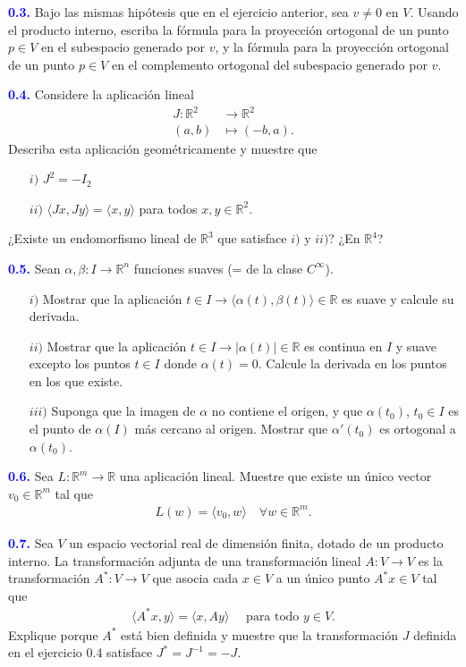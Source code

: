 \documentclass[oneside,11pt]{memoir}
\begin{document}
\textcolor{blue}{\textbf{0.3.}} Bajo las mismas hipótesis que en el ejercicio anterior, sea $v\neq 0$ en $V$. Usando el producto interno, escriba la fórmula para la proyección ortogonal de un punto $p\in V$ en el subespacio generado por $v$, y la fórmula para la proyección ortogonal de un punto $p\in V$ en el complemento ortogonal del subespacio generado por $v$.

\textcolor{blue}{\textbf{0.4.}} Considere la aplicación lineal 
\begin{align*}
    J:\mathbb{R}^2&\to \mathbb{R}^2\\
    (a,b)&\mapsto (-b,a).
\end{align*}
Describa esta aplicación geométricamente y muestre que
\begin{enumerate}
    \item[$i)$] $J^2=-I_2$
    \item[$ii)$] $\langle Jx, Jy \rangle = \langle x,y\rangle$ para todos $x,y\in \mathbb{R}^2$.
\end{enumerate}
¿Existe un endomorfismo lineal de $\mathbb{R}^3$ que satisface $i)$ y $ii)$? ¿En $\mathbb{R}^4$?

\textcolor{blue}{\textbf{0.5.}} Sean $\alpha,\beta:I\to \mathbb{R}^n$ funciones suaves (= de la clase $C^\infty$).
\begin{enumerate}
    \item[$i)$] Mostrar que la aplicación $t\in I\to \langle\alpha(t),\beta(t)\rangle \in \mathbb{R}$ es suave y calcule su derivada.
    \item[$ii)$] Mostrar que la aplicación $t\in I\to |\alpha(t)| \in \mathbb{R}$ es continua en $I$ y suave excepto los puntos $t\in I$ donde $\alpha(t)=0$. Calcule la derivada en los puntos en los que existe.
    \item[$iii)$] Suponga que la imagen de $\alpha$ no contiene el origen, y que $\alpha(t_0)$, $t_0\in I$ es el punto de $\alpha(I)$ más cercano al origen. Mostrar que $\alpha'(t_0)$ es ortogonal a $\alpha(t_0)$.
\end{enumerate}

\textcolor{blue}{\textbf{0.6.}}  Sea $L:\mathbb{R}^m\to \mathbb{R}$ una aplicación lineal. Muestre que existe un único vector $v_0\in\mathbb{R}^m$ tal que
\begin{align*}
    L(w)=\langle v_0,w\rangle \quad \forall w\in\mathbb{R}^m.
\end{align*}

\textcolor{blue}{\textbf{0.7.}} Sea $V$ un espacio vectorial real de dimensión finita, dotado de un producto interno. La transformación adjunta de una transformación lineal $A:V\to V$ es la transformación $A^*:V\to V$ que asocia cada $x\in V$ a un único punto $A^*x\in V$ tal que
\begin{align*}
    \langle A^*x,y\rangle= \langle x,Ay\rangle \quad \text{ para todo }y\in V.
\end{align*}
Explique porque $A^*$ está bien definida y muestre que la transformación $J$ definida en el ejercicio 0.4 satisface $J^*=J^{-1}=-J$.
\end{document}
